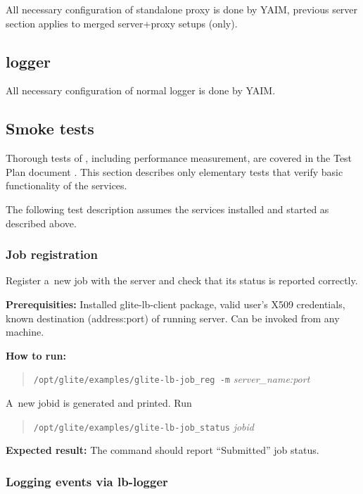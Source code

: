 All necessary configuration of standalone \LB proxy is done by YAIM,
previous \LB server section applies to merged server+proxy setups (\LBnew only).

\subsection{\LB logger}

All necessary configuration of normal \LB logger is done by YAIM.

\subsection{Smoke tests}

Thorough tests of \LB, including performance measurement, are
covered in the \LB Test Plan document \cite{lbtp}.
This section describes only elementary tests that verify basic
functionality of the services.

The following test description assumes the \LB services installed
and started as described above.

\def\req{\noindent\textbf{Prerequisities:}\xspace}
\def\how{\noindent\textbf{How to run:}\xspace}
\def\result{\noindent\textbf{Expected result:}\xspace}

\subsubsection{Job registration}

Register a~new job with the \LB server and check that its status is
reported correctly.

\req Installed glite-lb-client package, valid user's X509 credentials,
known destination (address:port) of running \LB server.
Can be invoked from any machine.

\how 
\begin{quote}
\verb'/opt/glite/examples/glite-lb-job_reg -m' \emph{server\_name:port}
\end{quote}
A~new jobid is generated and printed.  Run 
\begin{quote}
\verb'/opt/glite/examples/glite-lb-job_status' \emph{jobid}
\end{quote}

\result
The command should report ``Submitted'' job status.

\subsubsection{Logging events via lb-logger}

